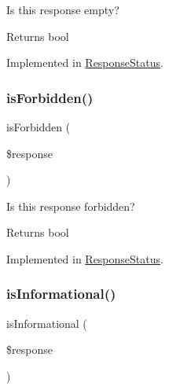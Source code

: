 Is this response empty?

\begin{DoxyReturn}{Returns}
bool 
\end{DoxyReturn}


Implemented in \mbox{\hyperlink{class_pes_1_1_http_1_1_response_status_a5166ac30ac60791ad8c30d76038b9371}{Response\+Status}}.

\mbox{\label{interface_pes_1_1_http_1_1_response_status_interface_aa0084ca7689eec6f23e6ea5f30e228fa}} 
\subsubsection{\texorpdfstring{is\+Forbidden()}{isForbidden()}}
{\footnotesize\ttfamily is\+Forbidden (\begin{DoxyParamCaption}\item[{Response\+Interface}]{\$response }\end{DoxyParamCaption})}

Is this response forbidden?

\begin{DoxyReturn}{Returns}
bool  
\end{DoxyReturn}


Implemented in \mbox{\hyperlink{class_pes_1_1_http_1_1_response_status_aa0084ca7689eec6f23e6ea5f30e228fa}{Response\+Status}}.

\mbox{\label{interface_pes_1_1_http_1_1_response_status_interface_aefe91e716fcd58aed7eea5eade4b7cc0}} 
\subsubsection{\texorpdfstring{is\+Informational()}{isInformational()}}
{\footnotesize\ttfamily is\+Informational (\begin{DoxyParamCaption}\item[{Response\+Interface}]{\$response }\end{DoxyParamCaption})}

